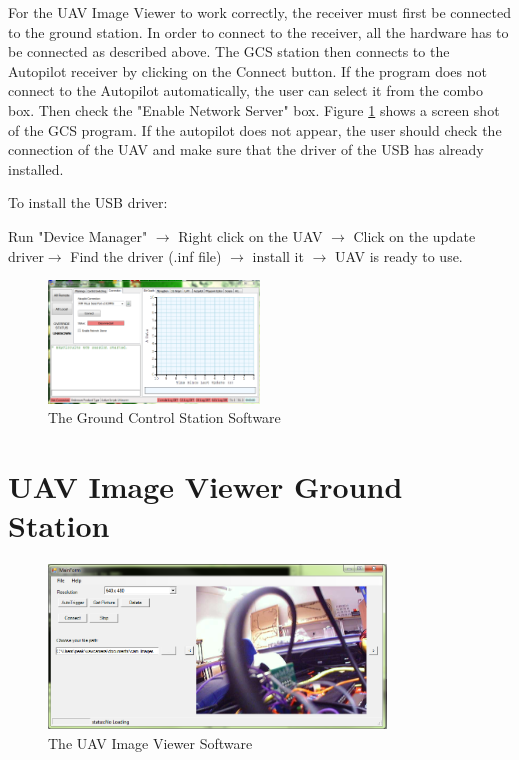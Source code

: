 \documentclass[a4paper,11pt]{article}
\begin{document}
For the UAV Image Viewer to work correctly, the receiver must first be connected to the ground station. 
In order to connect to the receiver, all the hardware has to be connected as described above.
The GCS station then connects to the Autopilot receiver by clicking on the Connect button. If the program does not connect to the Autopilot automatically, the user can select it from the combo box. Then check the "Enable Network Server" box. Figure \ref{GCS} shows a screen shot of the GCS program.
If the autopilot does not appear, the user should check the connection of the UAV and make sure that the driver of the USB has already installed. 

To install the USB driver:

 Run "Device Manager" $\rightarrow$ Right click on the UAV $\rightarrow$ Click on the update driver$\rightarrow$ Find the driver (.inf file) $\rightarrow$ install it $\rightarrow$ UAV is ready to use.

\begin{figure}[!htbp]
\begin{center}
\includegraphics[width=0.5\textwidth]{GCS.PNG}  
\caption{The Ground Control Station Software \label{GCS}}
\end{center}
\end{figure}
 


\section{UAV Image Viewer Ground Station}

\begin{figure}[!htbp]
\begin{center}
\includegraphics[width=0.8\textwidth]{windowApplication.PNG}  
\caption{The UAV Image Viewer Software\label{IVP}}
\end{center}
\end{figure}
\end{document}
